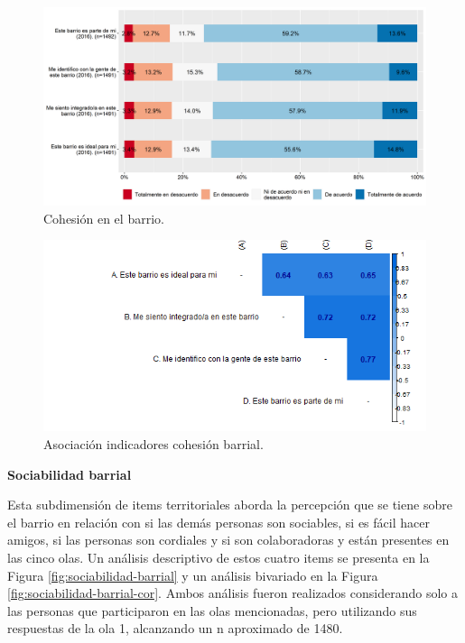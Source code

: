\documentclass[
  12pt,
]{book}
\begin{document}
\begin{figure}[H]

{\centering \includegraphics[width=1\linewidth,height=1\textheight]{output/graphs/cohesion-barrial} 

}

\caption{Cohesión en el barrio.}\label{fig:cohesion-barrial}
\end{figure}

\begin{figure}[H]

{\centering \includegraphics[width=1\linewidth,height=1\textheight]{output/graphs/cohesion-barrial_cor} 

}

\caption{Asociación indicadores cohesión barrial.}\label{fig:cohesion-barrial-cor}
\end{figure}

\textbf{Sociabilidad barrial}

Esta subdimensión de items territoriales aborda la percepción que se tiene sobre el barrio en relación con si las demás personas son sociables, si es fácil hacer amigos, si las personas son cordiales y si son colaboradoras y están presentes en las cinco olas. Un análisis descriptivo de estos cuatro items se presenta en la Figura \ref{fig:sociabilidad-barrial} y un análisis bivariado en la Figura \ref{fig:sociabilidad-barrial-cor}. Ambos análisis fueron realizados considerando solo a las personas que participaron en las olas mencionadas, pero utilizando sus respuestas de la ola 1, alcanzando un n aproximado de 1480.
\end{document}

